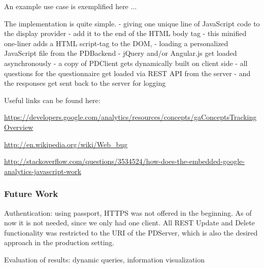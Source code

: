 		An example use case is exemplified here ...



		The implementation is quite simple. 
		 - giving one unique line of JavaScript code to the display provider
		 - add it to the end of the HTML body tag
		 - this minified one-liner adds a HTML script-tag to the DOM,
		 - loading a personalized JavaScript file from the PDBackend
		 - jQuery and/or Angular.js get loaded asynchronously
		 - a copy of PDClient gets dynamically built on client side
		 - all questions for the questionnaire get loaded via REST API from the server
		 - and the responses get sent back to the server for logging

		Useful links can be found here:

		\url{https://developers.google.com/analytics/resources/concepts/gaConceptsTrackingOverview}

		\url{http://en.wikipedia.org/wiki/Web_bug}

		\url{http://stackoverflow.com/questions/3534524/how-does-the-embedded-google-analytics-javascript-work}


	\subsubsection{Future Work}


		Authentication: using passport, HTTPS was not offered in the beginning. As of now it is not needed, since we only had one client. All REST Update and Delete functionality was restricted to the URI of the PDServer, which is also the desired approach in the production setting.

		Evaluation of results: dynamic queries, information visualization

